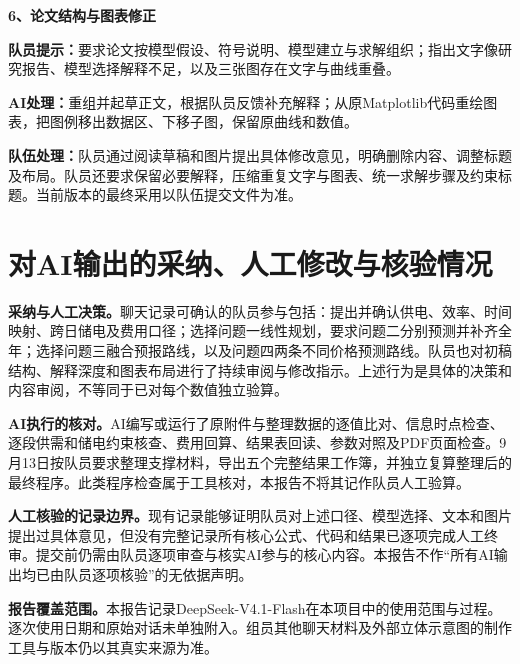 \documentclass[UTF8,a4paper,12pt]{ctexart}
\newcommand{\field}[2]{\par\noindent\textbf{#1：}#2\par}
\newcommand{\example}[2]{\vspace{6pt}\noindent\textbf{#1、#2}\par}
\begin{document}
\example{6}{论文结构与图表修正}
\field{队员提示}{要求论文按模型假设、符号说明、模型建立与求解组织；指出文字像研究报告、模型选择解释不足，以及三张图存在文字与曲线重叠。}
\field{AI处理}{重组并起草正文，根据队员反馈补充解释；从原Matplotlib代码重绘图表，把图例移出数据区、下移子图，保留原曲线和数值。}
\field{队伍处理}{队员通过阅读草稿和图片提出具体修改意见，明确删除内容、调整标题及布局。队员还要求保留必要解释，压缩重复文字与图表、统一求解步骤及约束标题。当前版本的最终采用以队伍提交文件为准。}

\section{对AI输出的采纳、人工修改与核验情况}

\textbf{采纳与人工决策。}聊天记录可确认的队员参与包括：提出并确认供电、效率、时间映射、跨日储电及费用口径；选择问题一线性规划，要求问题二分别预测并补齐全年；选择问题三融合预报路线，以及问题四两条不同价格预测路线。队员也对初稿结构、解释深度和图表布局进行了持续审阅与修改指示。上述行为是具体的决策和内容审阅，不等同于已对每个数值独立验算。

\textbf{AI执行的核对。}AI编写或运行了原附件与整理数据的逐值比对、信息时点检查、逐段供需和储电约束核查、费用回算、结果表回读、参数对照及PDF页面检查。9月13日按队员要求整理支撑材料，导出五个完整结果工作簿，并独立复算整理后的最终程序。此类程序检查属于工具核对，本报告不将其记作队员人工验算。

\textbf{人工核验的记录边界。}现有记录能够证明队员对上述口径、模型选择、文本和图片提出过具体意见，但没有完整记录所有核心公式、代码和结果已逐项完成人工终审。提交前仍需由队员逐项审查与核实AI参与的核心内容。本报告不作“所有AI输出均已由队员逐项核验”的无依据声明。

\textbf{报告覆盖范围。}本报告记录DeepSeek-V4.1-Flash在本项目中的使用范围与过程。逐次使用日期和原始对话未单独附入。组员其他聊天材料及外部立体示意图的制作工具与版本仍以其真实来源为准。
\end{document}
